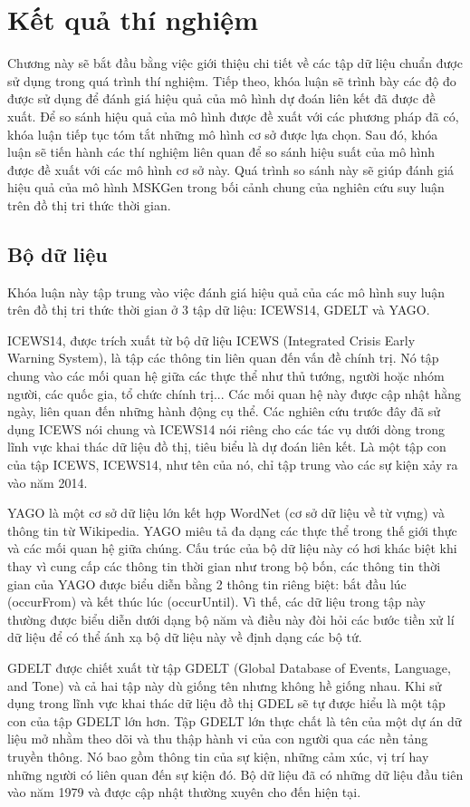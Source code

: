 \chapter{Kết quả thí nghiệm}
\label{Chapter5}
Chương này sẽ bắt đầu bằng việc giới thiệu chi tiết về các tập dữ liệu
chuẩn được sử dụng trong quá trình thí nghiệm. Tiếp theo, khóa luận sẽ
trình bày các độ đo được sử dụng để đánh giá hiệu quả của mô hình dự
đoán liên kết đã được đề xuất. Để so sánh hiệu quả của mô hình được
đề xuất với các phương pháp đã có, khóa luận tiếp tục tóm tắt những mô
hình cơ sở được lựa chọn. Sau đó, khóa luận sẽ tiến hành các thí nghiệm liên quan để so sánh hiệu suất của mô hình được đề xuất với các mô hình cơ sở này. Quá trình so sánh này sẽ giúp đánh giá hiệu quả của mô hình MSKGen trong bối cảnh chung của nghiên cứu suy luận trên đồ thị tri thức thời gian.

\section{Bộ dữ liệu}
Khóa luận này tập trung vào việc đánh giá hiệu quả của các mô hình suy luận trên đồ thị tri thức thời gian ở 3 tập dữ liệu: ICEWS14, GDELT và YAGO. 

ICEWS14, được trích xuất từ bộ dữ liệu ICEWS (Integrated Crisis Early Warning System), là tập các thông tin liên quan đến vấn đề chính trị. Nó tập chung vào các mối quan hệ giữa các thực thể như thủ tướng, người hoặc nhóm người, các quốc gia, tổ chức chính trị... Các mối quan hệ này được cập nhật hằng ngày, liên quan đến những hành động cụ thể. Các nghiên cứu trước đây đã sử dụng ICEWS nói chung và ICEWS14 nói riêng cho các tác vụ dưới dòng trong lĩnh vực khai thác dữ liệu đồ thị, tiêu biểu là dự đoán liên kết. Là một tập con của tập ICEWS, ICEWS14, như tên của nó, chỉ tập trung vào các sự kiện xảy ra vào năm 2014.

YAGO là một cơ sở dữ liệu lớn kết hợp WordNet (cơ sở dữ liệu về từ vựng) và thông tin từ Wikipedia. YAGO miêu tả đa dạng các thực thể
trong thế giới thực và các mối quan hệ giữa chúng. Cấu trúc của bộ dữ liệu này có hơi khác biệt khi thay vì cung cấp các thông tin thời gian như trong bộ bốn, các thông tin thời gian của YAGO được biểu diễn bằng 2 thông tin riêng biệt: bắt đầu lúc (occurFrom) và kết thúc lúc (occurUntil). Vì thế, các dữ liệu trong tập này thường được biểu diễn dưới dạng bộ năm và điều này đòi hỏi các bước tiền xử lí dữ liệu để có thể ánh xạ bộ dữ liệu này về định dạng các bộ tứ.

 GDELT được chiết xuất từ tập GDELT (Global Database of Events, Language, and Tone) và cả hai tập này dù giống tên nhưng không hề giống nhau. Khi sử dụng trong lĩnh vực khai thác dữ liệu đồ thị GDEL sẽ tự được hiểu là một tập con của tập GDELT lớn hơn. Tập GDELT lớn thực chất là tên của một dự án dữ liệu mở nhằm theo dõi và thu thập hành vi của con người qua các nền tảng truyền thông. Nó bao gồm thông tin của sự kiện, những cảm xúc, vị trí hay những người có liên quan đến sự kiện đó. Bộ dữ liệu đã có những dữ liệu đầu tiên vào năm 1979 và được cập nhật thường xuyên cho đến hiện tại.

